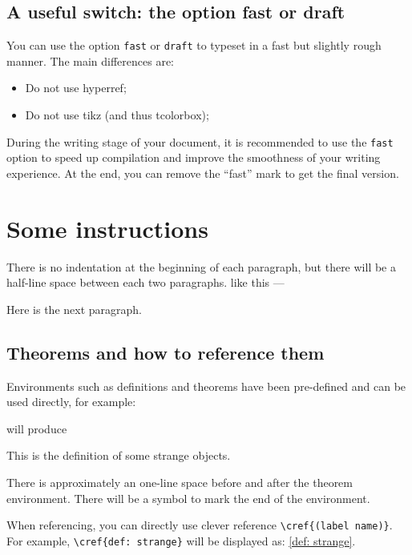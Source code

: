 \documentclass{minimart}
\begin{document}
\subsection{A useful switch: the option \textsf{fast} or \textsf{draft}}
You can use the option \verb|fast| or \verb|draft| to typeset in a fast but slightly rough manner. The main differences are:
\begin{itemize}
    \item Do not use hyperref; 
    \item Do not use tikz (and thus tcolorbox);
\end{itemize}

During the writing stage of your document, it is recommended to use the \verb|fast| option to speed up compilation and improve the smoothness of your writing experience. At the end, you can remove the ``fast'' mark to get the final version.

\section{Some instructions}

There is no indentation at the beginning of each paragraph, but there will be a half-line space between each two paragraphs. like this ---

Here is the next paragraph.

\subsection{Theorems and how to reference them}

Environments such as definitions and theorems have been pre-defined and can be used directly, for example:

There is approximately an one-line space before and after the theorem environment. There will be a symbol to mark the end of the environment.

When referencing, you can directly use clever reference \lstinline|\cref{(label name)}|. For example, \lstinline|\cref{def: strange}| will be displayed as: \cref{def: strange}.
\end{document}
